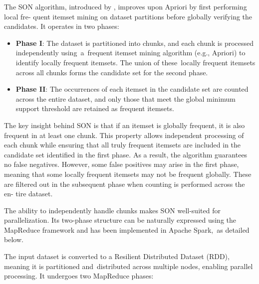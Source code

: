 \documentclass{Class/julia}
\begin{document}
The SON algorithm, introduced by \citet{savasere1995efficient}, improves upon Apriori by first performing local fre- quent itemset mining on dataset partitions before globally verifying the candidates. It operates in two phases:

\begin{itemize}
\item \textbf{Phase I}: The dataset is partitioned into chunks, and each chunk is processed independently using~a~frequent itemset mining algorithm (e.g., Apriori) to identify locally frequent itemsets. The union of these~locally frequent itemsets across all chunks forms the candidate set for the second phase.
\item \textbf{Phase II}: The occurrences of each itemset in the candidate set are counted across the entire dataset, and only those that meet the global minimum support threshold are retained as frequent itemsets.
\end{itemize}

The key insight behind SON is that if an itemset is globally frequent, it is also frequent in at least one chunk. This property allows independent processing of each chunk while ensuring that all truly frequent itemsets are included in the candidate set identified in the first phase. As a result, the algorithm guarantees no false negatives. However, some false positives may arise in the first phase, meaning that some locally frequent itemsets may not be frequent globally. These are filtered out in the subsequent phase when counting is performed across the en- tire dataset.

The ability to independently handle chunks makes SON well-suited for parallelization. Its two-phase structure can be naturally expressed using the MapReduce framework and has been implemented in Apache Spark,~as detailed below.

The input dataset is converted to a Resilient Distributed Dataset (RDD), meaning it is partitioned and~distributed across multiple nodes, enabling parallel processing. It undergoes two MapReduce phases:
\end{document}
